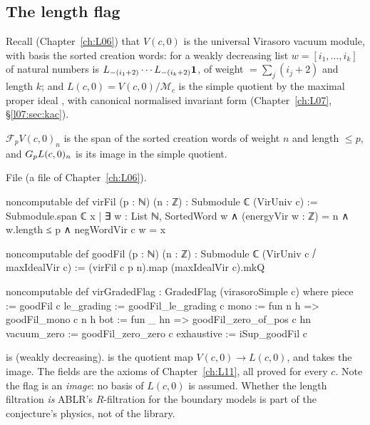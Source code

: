 \subsection{The length flag}

Recall (Chapter~\ref{ch:L06}) that $V(c,0)$ is the universal Virasoro vacuum module, with basis the
sorted creation words:  for a weakly decreasing list $w = [i_1,\dots,i_k]$ of
natural numbers is $L_{-(i_1+2)}\cdots L_{-(i_k+2)}\mathbf{1}$, of weight
 $= \sum_j(i_j+2)$ and length $k$; and $L(c,0) = V(c,0)/\mathcal M_c$ is the simple
quotient by the maximal proper ideal , with canonical normalised invariant form
 (Chapter~\ref{ch:L07}, \S\ref{l07:sec:kac}).

\begin{definition}\label{l19:def:lengthflag}
$\mathcal F_pV(c,0)_n$ is the span of the sorted creation words of weight $n$ and length $\le p$, and
$G_pL(c,0)_n$ is its image in the simple quotient.
\end{definition}

\noindent File  (a file of
Chapter~\ref{ch:L06}).
\begin{leancode}
noncomputable def virFil (p : ℕ) (n : ℤ) : Submodule ℂ (VirUniv c) :=
  Submodule.span ℂ
    { x | ∃ w : List ℕ, SortedWord w ∧ (energyVir w : ℤ) = n ∧ w.length ≤ p ∧
            negWordVir c w = x }

noncomputable def goodFil (p : ℕ) (n : ℤ) : Submodule ℂ (VirUniv c ⧸ maxIdealVir c) :=
  (virFil c p n).map (maxIdealVir c).mkQ

noncomputable def virGradedFlag : GradedFlag (virasoroSimple c) where
  piece := goodFil c
  le_grading := goodFil_le_grading c
  mono := fun n h => goodFil_mono c n h
  bot := fun _ hn => goodFil_zero_of_pos c hn
  vacuum_zero := goodFil_zero_zero c
  exhaustive := iSup_goodFil c
\end{leancode}

\begin{dictionary}
 is  (weakly decreasing).  is
the quotient map $V(c,0)\to L(c,0)$, and  takes the image. The  fields are
the axioms of Chapter~\ref{ch:L11}, all proved for every $c$. Note the flag is an \emph{image}: no
basis of $L(c,0)$ is assumed. Whether the length filtration \emph{is} ABLR's $R$-filtration for the
boundary models is part of the conjecture's physics, not of the library.
\end{dictionary}

